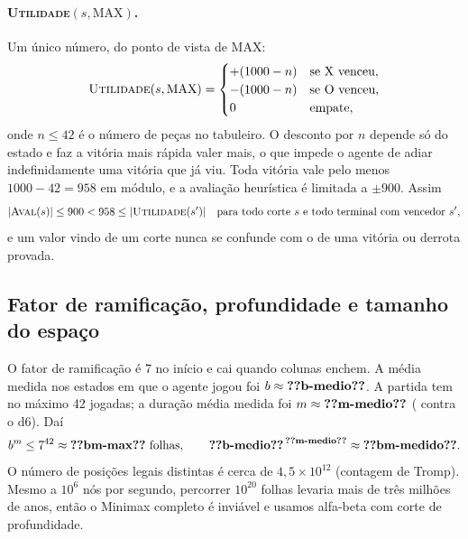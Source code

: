 \documentclass[11pt,a4paper]{article}
\newcommand{\fn}[1]{\textsc{#1}}            %
\begin{document}
\paragraph{\fn{Utilidade}$(s, \text{MAX})$.} Um único número, do ponto de vista de MAX:
\[
  \fn{Utilidade}(s,\text{MAX}) =
  \begin{cases}
    +(1000 - n) & \text{se X venceu},\\
    -(1000 - n) & \text{se O venceu},\\
    0 & \text{empate},
  \end{cases}
\]
onde $n \le 42$ é o número de peças no tabuleiro. O desconto por $n$ depende só do estado e faz a vitória mais
rápida valer mais, o que impede o agente de adiar indefinidamente uma vitória que já viu. Toda vitória vale
pelo menos $1000 - 42 = 958$ em módulo, e a avaliação heurística é limitada a $\pm 900$. Assim
\[ |\fn{Aval}(s)| \le 900 < 958 \le |\fn{Utilidade}(s')| \quad\text{para todo corte } s \text{ e todo terminal com vencedor } s', \]
e um valor vindo de um corte nunca se confunde com o de uma vitória ou derrota provada.

\subsection{Fator de ramificação, profundidade e tamanho do espaço}
\label{sec:bm}
O fator de ramificação é 7 no início e cai quando colunas enchem. A média medida nos estados em que o agente
jogou foi $b \approx \dado{b-medio}$. A partida tem no máximo 42 jogadas; a duração média medida foi
$m \approx \dado{m-medio}$ ( contra o d6). Daí
\[
  b^m \le 7^{42} \approx \dado{bm-max} \text{ folhas}, \qquad
  \dado{b-medio}^{\,\dado{m-medio}} \approx \dado{bm-medido}.
\]
O número de posições legais distintas é cerca de $4{,}5 \times 10^{12}$ (contagem de Tromp). Mesmo a
$10^6$ nós por segundo, percorrer $10^{20}$ folhas levaria mais de três milhões de anos, então o Minimax
completo é inviável e usamos alfa-beta com corte de profundidade.
\end{document}
